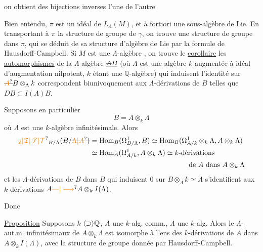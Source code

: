 on obtient des bijections inverses l'une de l'autre

Bien entendu, $\pi$ est un idéal  de $L_\Lambda(M)$, et
à fortiori une sous-algèbre de Lie. En
transportant à $\pi$ la structure de groupe de
$\gamma$, on trouve une structure de groupe dans
$\pi$, qui se déduit de sa structure
d'algèbre de Lie par la formule de
Hausdorff-Campbell. Si $M$ est une
$\Lambda$-algèbre , on trouve le
\uline{corollaire} les \uline{automorphismes} de la
$\Lambda$-algèbre $\underline{\deleted{A}B}$ (où $\Lambda$ est une algèbre
$k$-augmentée à  idéal d'augmentation
nilpotent, $k$ étant une $\mathbb Q$-algèbre)
qui induisent l'identité sur $\deleted{\unsure{A}}B\otimes_\Lambda k$
correspondent biunivoquement aux
$\Lambda$-dérivations  de $B$ telles que $DB\subset I(\Lambda)B$.

Supposons en particulier
\[
B=A\otimes_k\Lambda
\]
où $\Lambda$ est une $k$-algèbre infinitésimale.
Alors 
\[
\begin{aligned}
\unsure{\mathfrak g|\mathfrak T|\mathscr T|\mathcal T}_{B/\Lambda}\deleted{(B/\unsure{\Lambda|A})}
&=\mathrm{Hom}_B(\Omega^1_{B/\Lambda},B)\simeq\mathrm{Hom}_B(\Omega^1_{A/k}\otimes_k\Lambda,A\otimes_k\Lambda)\\
&\simeq\mathrm{Hom}_A(\Omega^1_{A/k},A\otimes_k\Lambda)\simeq k\text{-dérivations}\\
&\hspace{14em}\text{de }A\text{ dans }A\otimes_k\Lambda
\end{aligned}
\]
et les $\Lambda$-dérivations de $B$ dans $B$ qui
induisent $0$ sur $B\otimes_\Lambda k\simeq\Lambda$ s'identifient
aux $k$-dérivations $A\unsure{\text{—}|\longrightarrow} A\otimes_k I(\Lambda)$.

Donc

\uline{Proposition} Supposons $k$  $\inserted{\supset}\mathbb Q$, $A$ une
\reversemarginpar{}\normalmarginpar
$k$-alg. comm., $\Lambda$ une $k$-alg. 
Alors le  $\Lambda$-aut.m. infinitésimaux de
$A\otimes_k\Lambda$  est isomorphe
à l'ens des $k$-dérivations de
$A$ dans $A\otimes_k I(\Lambda)$, avec la structure
de groupe donnée par Hausdorff-Campbell.


